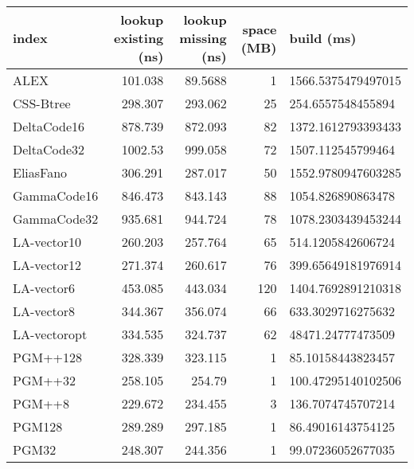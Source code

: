 \begin{tabular}{lrrrl}
\hline
 index             &   lookup existing (ns) &   lookup missing (ns) &   space (MB) & build (ms)         \\
\hline
 ALEX              &               101.038  &               89.5688 &            1 & 1566.5375479497015 \\
 CSS-Btree         &               298.307  &              293.062  &           25 & 254.6557548455894  \\
 DeltaCode16       &               878.739  &              872.093  &           82 & 1372.1612793393433 \\
 DeltaCode32       &              1002.53   &              999.058  &           72 & 1507.112545799464  \\
 EliasFano         &               306.291  &              287.017  &           50 & 1552.9780947603285 \\
 GammaCode16       &               846.473  &              843.143  &           88 & 1054.826890863478  \\
 GammaCode32       &               935.681  &              944.724  &           78 & 1078.2303439453244 \\
 LA-vector10       &               260.203  &              257.764  &           65 & 514.1205842606724  \\
 LA-vector12       &               271.374  &              260.617  &           76 & 399.65649181976914 \\
 LA-vector6        &               453.085  &              443.034  &          120 & 1404.7692891210318 \\
 LA-vector8        &               344.367  &              356.074  &           66 & 633.3029716275632  \\
 LA-vectoropt      &               334.535  &              324.737  &           62 & 48471.24777473509  \\
 PGM++128          &               328.339  &              323.115  &            1 & 85.10158443823457  \\
 PGM++32           &               258.105  &              254.79   &            1 & 100.47295140102506 \\
 PGM++8            &               229.672  &              234.455  &            3 & 136.7074745707214  \\
 PGM128            &               289.289  &              297.185  &            1 & 86.49016143754125  \\
 PGM32             &               248.307  &              244.356  &            1 & 99.07236052677035  \\

\end{tabular}
